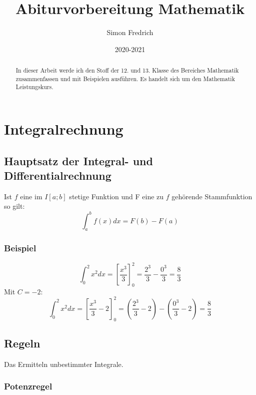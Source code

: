 \documentclass[12pt, a4paper]{report}
\title{Abiturvorbereitung Mathematik}
\author{Simon Fredrich}
\date{2020-2021}
\begin{document}
\begin{titlepage}
\maketitle
\end{titlepage}

\begin{abstract}
In dieser Arbeit werde ich den Stoff der 12. und 13. Klasse des Bereiches Mathematik zusammenfassen und mit Beispielen ausführen. Es handelt sich um den Mathematik Leistungskurs.
\end{abstract}

\chapter{Integralrechnung}

\section{Hauptsatz der Integral- und Differentialrechnung}
Ist $f$ eine im $I[a;b]$ stetige Funktion und F eine zu $f$ gehörende Stammfunktion so gilt:\\
\begin{equation}
\int_{a}^{b} f(x) dx = F(b)-F(a)
\end{equation}

\subsection{Beispiel}

\begin{equation}
\int_{0}^{2} x^2 dx = \left[\frac{x^3}{3}\right]_0^2=\frac{2^3}{3}-\frac{0^3}{3}=\frac{8}{3}
\end{equation}
Mit $C=-2$:
\begin{equation}
\int_{0}^{2} x^2 dx = \left[\frac{x^3}{3}-2\right]_0^2=\left(\frac{2^3}{3}-2\right)-\left(\frac{0^3}{3}-2\right)=\frac{8}{3}
\end{equation}

\section{Regeln}
Das Ermitteln unbestimmter Integrale.
\subsection{Potenzregel}
\end{document}
